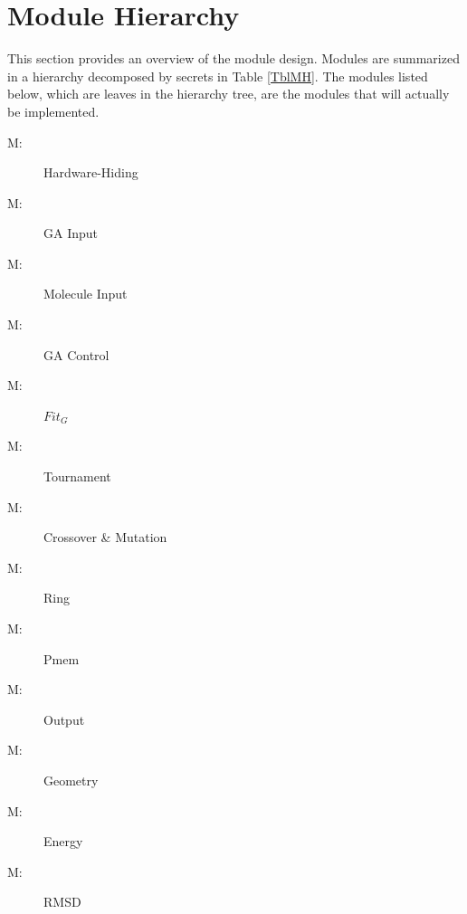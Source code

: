 \documentclass[12pt, titlepage]{article}
\newcounter{mnum}
\newcommand{\mthemnum}{M\themnum}
\begin{document}
\section{Module Hierarchy} \label{SecMH}

This section provides an overview of the module design. Modules are summarized
in a hierarchy decomposed by secrets in Table \ref{TblMH}. The modules listed
below, which are leaves in the hierarchy tree, are the modules that will
actually be implemented.

\begin{description}
\item [ \mthemnum \label{mHH}:] Hardware-Hiding
\item [ \mthemnum \label{mGAIn}:] GA Input
\item [ \mthemnum \label{mMolIn}:] Molecule Input
\item [ \mthemnum \label{mGAC}:] GA Control
\item [ \mthemnum \label{mFitg}:] $Fit_G$
\item [ \mthemnum \label{mTour}:] Tournament
\item [ \mthemnum \label{mCM}:] Crossover \& Mutation
\item [ \mthemnum \label{mRing}:] Ring
\item [ \mthemnum \label{mPmem}:] Pmem
\item [ \mthemnum \label{mOut}:] Output
\item [ \mthemnum \label{mGeometry}:] Geometry
\item [ \mthemnum \label{mE}:] Energy
\item [ \mthemnum \label{mRMSD}:] RMSD
\end{description}
\end{document}
